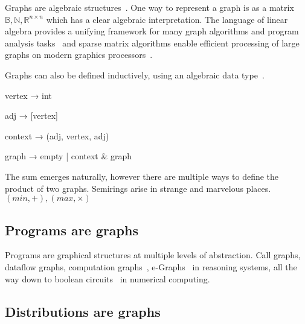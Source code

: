 \documentclass[11pt]{article}
\begin{document}

    Graphs are algebraic structures~\cite{weisfeiler1968reduction}. One way to represent a graph is as a matrix ${\mathbb{B}, \mathbb{N}, \mathbb{R}}^{n\times n}$ which has a clear algebraic interpretation. The language of linear algebra provides a unifying framework for many graph algorithms and program analysis tasks~\citep{kepner2011graph} and sparse matrix algorithms enable efficient processing of large graphs on modern graphics processors~\citep{kepner2016mathematical}.

    Graphs can also be defined inductively, using an algebraic data type~\cite{mokhov2017algebraic}.

    vertex  → int

    adj     → [vertex]

    context → (adj, vertex, adj)

    graph   → empty | context & graph

    The sum emerges naturally, however there are multiple ways to define the product of two graphs. Semirings arise in strange and marvelous places. $(min, +), (max, \times)$

    \subsection{Programs are graphs}\label{sec:program-graphs}

    Programs are graphical structures at multiple levels of abstraction. Call graphs, dataflow graphs, computation graphs~\citep{breuleux2017automatic}, e-Graphs~\citep{willsey2020egg} in reasoning systems, all the way down to boolean circuits~\citep{miller1988efficient} in numerical computing.


    \pagebreak\subsection{Distributions are graphs}\label{sec:distributions-graphs}
\end{document}
